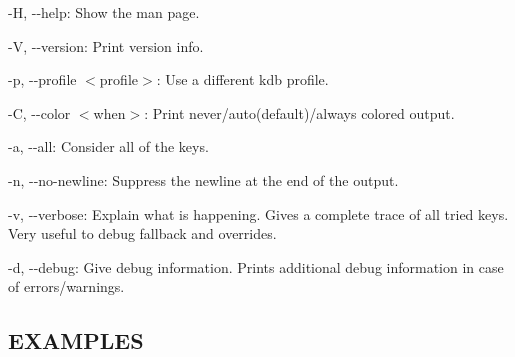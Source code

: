 \begin{DoxyItemize}
\item {\ttfamily -\/H}, {\ttfamily -\/-\/help}\+: Show the man page.
\item {\ttfamily -\/V}, {\ttfamily -\/-\/version}\+: Print version info.
\item {\ttfamily -\/p}, {\ttfamily -\/-\/profile $<$profile$>$}\+: Use a different kdb profile.
\item {\ttfamily -\/C}, {\ttfamily -\/-\/color $<$when$>$}\+: Print never/auto(default)/always colored output.
\item {\ttfamily -\/a}, {\ttfamily -\/-\/all}\+: Consider all of the keys.
\item {\ttfamily -\/n}, {\ttfamily -\/-\/no-\/newline}\+: Suppress the newline at the end of the output.
\item {\ttfamily -\/v}, {\ttfamily -\/-\/verbose}\+: Explain what is happening. Gives a complete trace of all tried keys. Very useful to debug fallback and overrides.
\item {\ttfamily -\/d}, {\ttfamily -\/-\/debug}\+: Give debug information. Prints additional debug information in case of errors/warnings.
\end{DoxyItemize}

\subsection*{E\+X\+A\+M\+P\+L\+ES}


